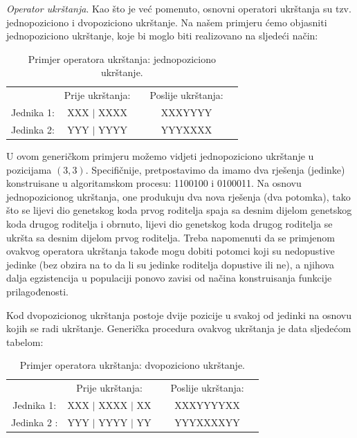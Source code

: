 \documentclass[a4paper, utf8, 11pt, colorlinks]{book}
\begin{document}
\emph{Operator ukrštanja}. Kao što je već pomenuto, osnovni operatori ukrštanja su tzv. jednopoziciono i dvopoziciono ukrštanje. Na našem primjeru ćemo objasniti  jednopoziciono ukrštanje, koje bi moglo biti realizovano na sljedeći način:
\begin{table}[H]
	\centering

\begin{tabular}{ccccc}
              &	Prije ukrštanja: &    &  Poslije ukrštanja:   \\
   Jednika 1: &	XXX $\mid$ XXXX  &    &   XXXYYYY             \\
   Jedinka 2:&	YYY $\mid$ YYYY  &    &   YYYXXXX             \\
\end{tabular}
	\caption{Primjer operatora ukrštanja: jednopoziciono ukrštanje.}
\end{table}
U ovom generičkom primjeru možemo vidjeti jednopoziciono ukrštanje u pozicijama $(3, 3).$  Specifičnije, pretpostavimo da imamo dva rješenja (jedinke) konstruisane u algoritamskom procesu: 1100100 i 0100011. Na osnovu jednopozicionog ukrštanja, one produkuju dva nova rješenja (dva potomka), tako što se lijevi dio genetskog koda prvog roditelja spaja sa desnim dijelom genetskog koda drugog roditelja i obrnuto, lijevi dio genetskog koda drugog roditelja se ukršta sa desnim dijelom prvog roditelja. 
Treba napomenuti da se primjenom ovakvog operatora ukrštanja takođe mogu dobiti potomci koji su nedopustive jedinke (bez obzira na to da li su jedinke roditelja dopustive ili ne), a njihova dalja egzistencija u populaciji ponovo zavisi od načina konstruisanja funkcije prilagođenosti. 

Kod dvopozicionog ukrštanja postoje dvije pozicije u svakoj od jedinki na osnovu kojih se radi ukrštanje. Generička procedura ovakvog ukrštanja je data sljedećom tabelom: 
\begin{table}[H]
	\centering
	
	\begin{tabular}{ccccc}
		&	Prije ukrštanja: &    &  Poslije ukrštanja:                         \\
		Jednika 1: &	XXX $\mid$ XXXX $\mid$ XX  &    &   XXXYYYYXX             \\
		Jedinka 2 :&	YYY $\mid$ YYYY $\mid$ YY  &    &   YYYXXXXYY             \\
	\end{tabular}
	\caption{Primjer operatora ukrštanja: dvopoziciono ukrštanje.}
\end{table}
\end{document}
